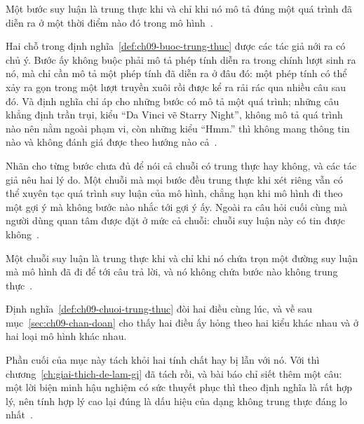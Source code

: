 \begin{definition}
\label{def:ch09-buoc-trung-thuc}
Một bước suy luận là trung thực khi và chỉ khi nó mô tả đúng một quá trình đã
diễn ra ở một thời điểm nào đó trong mô hình~\autocite{p21metrics}.
\end{definition}

Hai chỗ trong định nghĩa~\ref{def:ch09-buoc-trung-thuc} được các tác giả nới
ra có chủ ý. Bước ấy không buộc phải mô tả phép tính diễn ra trong chính lượt
sinh ra nó, mà chỉ cần mô tả một phép tính đã diễn ra ở đâu đó: một phép tính
có thể xảy ra gọn trong một lượt truyền xuôi rồi được kể ra rải rác qua nhiều
câu sau đó. Và định nghĩa chỉ áp cho những bước có mô tả một quá trình; những
câu khẳng định trần trụi, kiểu \enquote{Da Vinci vẽ Starry Night}, không mô
tả quá trình nào nên nằm ngoài phạm vi, còn những
 kiểu \enquote{Hmm.} thì không mang thông tin nào và
không đánh giá được theo hướng nào cả~\autocite{p21metrics}.

Nhãn cho từng bước chưa đủ để nói cả chuỗi có trung thực hay không, và các tác
giả nêu hai lý do. Một chuỗi mà mọi bước đều trung thực khi xét riêng vẫn có
thể xuyên tạc quá trình suy luận của mô hình, chẳng hạn khi mô hình đi theo một gợi ý
mà không bước nào nhắc tới gợi ý ấy. Ngoài ra câu hỏi cuối cùng mà người dùng
quan tâm được đặt ở mức cả chuỗi: chuỗi suy luận này có tin được
không~\autocite{p21metrics}.

\begin{definition}
\label{def:ch09-chuoi-trung-thuc}
Một chuỗi suy luận là trung thực khi và chỉ khi nó chứa trọn một đường suy
luận mà mô hình đã đi để tới câu trả lời, và nó không chứa bước nào không
trung thực~\autocite{p21metrics}.
\end{definition}

Định nghĩa~\ref{def:ch09-chuoi-trung-thuc} đòi hai điều cùng lúc, và về sau
mục~\ref{sec:ch09-chan-doan} cho thấy hai điều ấy hỏng theo hai kiểu khác nhau
và ở hai loại mô hình khác nhau.

Phần cuối của mục này tách  khỏi hai tính chất
hay bị lẫn với nó.
Với  thì chương~\ref{ch:giai-thich-de-lam-gi} đã
tách rồi, và bài
báo chỉ siết thêm một câu: một lời biện minh hậu nghiệm có sức thuyết phục thì
theo định nghĩa là rất hợp lý, nên tính hợp lý cao lại đúng là dấu hiệu của
dạng không trung thực đáng lo nhất~\autocite{p21metrics}.

